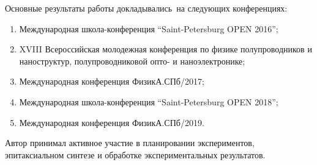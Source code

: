 {\probation}
Основные результаты работы докладывались~на следующих конференциях:
\begin{enumerate}[beginpenalty=10000]
  \item Международная школа-конференция “Saint-Petersburg OPEN 2016”;
  \item XVIII Всероссийская молодежная конференция по физике полупроводников и наноструктур, полупроводниковой опто- и наноэлектронике;
  \item Международная конференция ФизикА.СПб/2017;
  \item Международная школа-конференция “Saint-Petersburg OPEN 2018”;
  \item Международная конференция ФизикА.СПб/2019.
\end{enumerate}

{\contribution} Автор принимал активное участие в планировании экспериментов, эпитаксиальном синтезе и обработке экспериментальных результатов.

